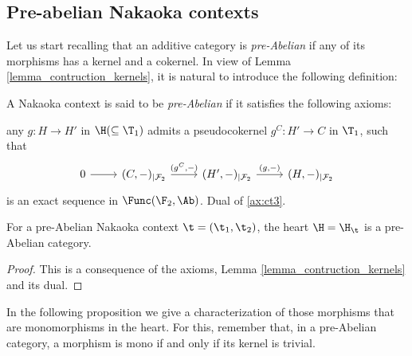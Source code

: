 \subsection{Pre-abelian Nakaoka contexts}

Let us start recalling that an additive category is  {\em pre-Abelian} if any of its morphisms has a kernel and a cokernel. In view of  Lemma \ref{lemma_contruction_kernels}, it is natural to introduce the following definition:

\begin{definition}
A Nakaoka context is said to be {\em pre-Abelian} if it satisfies the following axioms:
\begin{torsionaxioms}\setcounter{enumi}{2}
\item\label{ax:ct3} any  $g\colon H\to H'$ in $\H(\subseteq \T_1)$ admits a pseudocokernel $g^C\colon H'\to C$ in $\T_1$, such that
\begin{equation*}
\begin{tikzcd}
0\arrow{r} &(C,-)_{|\mathcal{F}_2}\arrow{r}{(g^C,-)} & (H',-)_{|\mathcal{F}_2}\arrow{r}{(g,-)}& (H,-)_{|\mathcal{F}_2}
\end{tikzcd}
\end{equation*}
is an exact sequence in $\Func(\F_2,\Ab)$. 
\varitem{^\ast}\label{ax:ct3op} Dual of \ref{ax:ct3}.
\end{torsionaxioms}
\end{definition}



\begin{thm}\label{pre_abelian_theorem}
For a pre-Abelian Nakaoka context $\t=(\t_1,\t_2)$, the heart $\H=\H_\t$ is a pre-Abelian category.
\end{thm}
\begin{proof}
This is a consequence of the axioms, Lemma \ref{lemma_contruction_kernels} and its dual.
\end{proof}

In the following proposition we give a characterization of those morphisms that are monomorphisms in the heart. For this, remember that, in a pre-Abelian category, a morphism is mono if and only if its kernel is trivial. 

